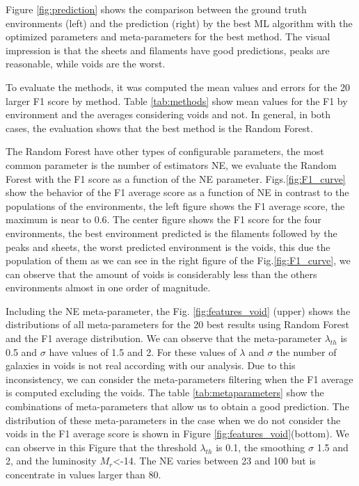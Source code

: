 \documentclass[usenatbib]{mnras}
\begin{document}
Figure \ref{fig:prediction} shows the comparison between the ground
truth environments (left) and the prediction (right) by the best ML algorithm
with the optimized parameters and meta-parameters  for the best
method. 
The visual impression is that the sheets and filaments have good predictions,
peaks are reasonable, while voids are the worst. 




To evaluate the methods, it was computed the mean values and errors
for the 20 larger F1 score by method. Table \ref{tab:methods} show mean
values for the F1 by environment and the averages considering voids 
and not. 
In general, in both cases, the evaluation shows that the best method is
the Random Forest.  


The Random Forest have other types of configurable parameters, the
most common parameter is the number of estimators NE, we evaluate the
Random Forest with the F1 score as a function of the NE parameter.  
Figs.\ref{fig:F1_curve} show the behavior of the F1 average score as a
function of NE in contrast to the populations of the environments,
the left figure shows the F1 average score,
the maximum is near to 0.6.
The center figure shows the F1 score for the four environments,
the best environment predicted is the filaments followed by the peaks and sheets,
the worst predicted environment is the voids,
this due the population of them as we can see in the right figure of the Fig.\ref{fig:F1_curve},
we can observe that the amount of voids is considerably less than the
others environments almost in one order of magnitude. 

Including the NE meta-parameter, the Fig. \ref{fig:features_void} (upper)
shows the distributions of all meta-parameters for the 20 best results
using Random Forest and the F1 average distribution. We can observe that the meta-parameter $\lambda_{th}$
is 0.5 and $\sigma$ have values of 1.5 and 2. For these
values of $\lambda$ and $\sigma$ the number of galaxies in voids is not real according with our analysis. Due to this inconsistency, we can consider the meta-parameters filtering when the F1 average is computed excluding the voids. The table \ref{tab:metaparameters} show the combinations of meta-parameters that allow us to obtain a good prediction. The distribution of these meta-parameters
in the case when we do not consider the voids in the F1 average score is shown in Figure \ref{fig:features_void}(bottom). We can
observe in this Figure that the threshold $\lambda_{th}$ is 0.1, the smoothing $\sigma$ 1.5 and 2, and the luminosity $M_r$<-14. The NE varies between 23 and 100 but is concentrate in values larger than 80. 
\end{document}
